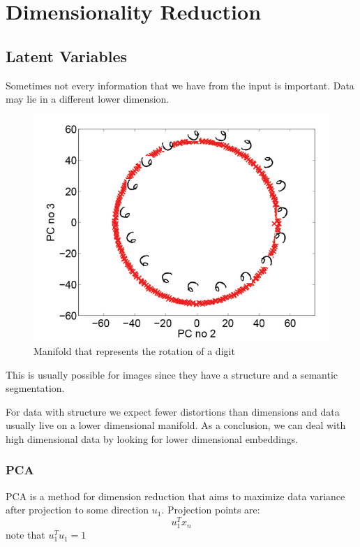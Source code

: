 \section{Dimensionality Reduction}
\subsection{Latent Variables}
Sometimes not every information that we have from the input is important. Data may lie in a different lower dimension.
\begin{figure}[H]
    \centering
    \includegraphics[width = 15cm]{images/DimRed/Manifold.png}
    \caption{Manifold that represents the rotation of a digit}
    \label{fig:manifold}
\end{figure}
This is usually possible for images since they have a structure and a semantic segmentation.

For data with structure we expect fewer distortions than dimensions and data usually live on a lower dimensional manifold. As a conclusion, we can deal with high dimensional data by looking for lower dimensional embeddings.

\subsubsection{PCA}
PCA is a method for dimension reduction that aims to maximize data variance after projection to some direction $u_{1}$. Projection points are:
\begin{equation} \label{projection}
    u_{1}^{T}x_{n}
\end{equation}
note that $u_{1}^{T}u_{1} = 1$

